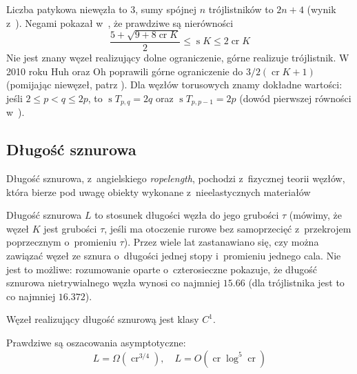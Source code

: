 Liczba patykowa niewęzła to $3$, sumy spójnej $n$ trójlistników to $2n+4$ (wynik z~\cite{greilsheimer97}).
Negami pokazał w~\cite{negami91}, że prawdziwe są nierówności
\[
    \frac{5+\sqrt{9 + 8 \operatorname{cr} K}}{2} \le \operatorname{s} K \le 2 \operatorname{cr} K
\]
Nie jest znany węzeł realizujący dolne ograniczenie, górne realizuje trójlistnik.
W 2010 roku Huh oraz Oh poprawili górne ograniczenie do $3/2(\operatorname{cr} K+1)$ (pomijając niewęzeł, patrz \cite{huh11}).
Dla węzłów torusowych znamy dokładne wartości: jeśli $2 \le p < q \le 2p$, to $\operatorname{s} T_{p,q} = 2q$ oraz $\operatorname{s} T_{p, p-1} = 2p$ (dowód pierwszej równości w~\cite{jin97}).


\subsection{Długość sznurowa} %
\label{sub:ropelength}
Długość sznurowa, z~angielskiego \emph{ropelength}, pochodzi z~fizycznej teorii węzłów, która bierze pod uwagę obiekty wykonane z~nieelastycznych materiałów

Długość sznurowa $L$ to stosunek długości węzła do jego grubości $\tau$ (mówimy, że węzeł $K$ jest grubości $\tau$, jeśli ma otoczenie rurowe bez samoprzecięć z~przekrojem poprzecznym o~promieniu $\tau$).
Przez wiele lat zastanawiano się, czy można zawiązać węzeł ze sznura o~długości jednej stopy i~promieniu jednego cala.
Nie jest to możliwe: rozumowanie oparte o~czterosieczne pokazuje, że długość sznurowa nietrywialnego węzła wynosi co najmniej $15.66$ (dla trójlistnika jest to co najmniej $16.372$).

Węzeł realizujący długość sznurową jest klasy $C^1$.

Prawdziwe są oszacowania asymptotyczne:
\[
    L = \Omega (\operatorname{cr}^{3/4}),  \quad
    L = O(\operatorname{cr} \log^5 \operatorname{cr})
\]


